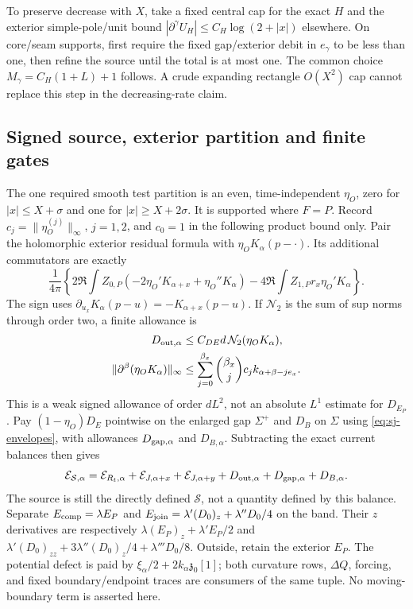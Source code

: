 To preserve decrease with $X$, take a fixed central cap for the exact
$H$ and the exterior simple-pole/unit bound
$|\partial^\gamma U_H|\le C_H\log(2+|x|)$ elsewhere. On core/seam
supports, first require the fixed gap/exterior debit in $e_\gamma$ to
be less than one, then refine the source until the total is at most one.
The common choice $M_\gamma=C_H(1+L)+1$ follows. A crude expanding
rectangle $O(X^2)$ cap cannot replace this step in the decreasing-rate claim.

\subsection{Signed source, exterior partition and finite gates}
The one required smooth test partition is an even, time-independent
$\eta_O$, zero for $|x|\le X+\sigma$ and one for $|x|\ge X+2\sigma$.
It is supported where $F=P$. Record $c_j=\|\eta_O^{(j)}\|_\infty$,
$j=1,2$, and $c_0=1$ in the following product bound only. Pair the
holomorphic exterior residual formula with $\eta_OK_\alpha(p-\cdot)$.
Its additional commutators are exactly
\begin{equation}
 \frac1{4\pi}\left\{2\Re\int Z_{0,P}
           (-2\eta_O'K_{\alpha+x}+\eta_O''K_\alpha)
       -4\Re\int Z_{1,P}r_x\eta_O'K_\alpha\right\}.
 \label{eq:sj-partition}
\end{equation}
The sign uses $\partial_{u_x}K_\alpha(p-u)=-K_{\alpha+x}(p-u)$.
If $\mathcal N_2$ is the sum of sup norms through order two, a finite
allowance is
\begin{align}
 D_{{\rm out},\alpha}&\le C_{DE}d\,\mathcal N_2(\eta_OK_\alpha),\notag\\
 \|\partial^\beta(\eta_OK_\alpha)\|_\infty
 &\le\sum_{j=0}^{\beta_x}\binom{\beta_x}{j}c_j
                                     k_{\alpha+\beta-je_x}.
 \label{eq:sj-exterior-residual}
\end{align}
This is a weak signed allowance of order $dL^2$, not an absolute
$L^1$ estimate for $D_{E_P}$. Pay $(1-\eta_O)D_E$ pointwise on the
enlarged gap $\Sigma^+$ and $D_B$ on $\Sigma$ using
\eqref{eq:sj-envelopes}, with allowances $D_{{\rm gap},\alpha}$ and
$D_{B,\alpha}$. Subtracting the exact current balances then gives
\begin{equation}
 \mathcal E_{\mathcal S,\alpha}
 =\mathcal E_{R_t,\alpha}+\mathcal E_{J,\alpha+x}
   +\mathcal E_{J,\alpha+y}+D_{{\rm out},\alpha}
                         +D_{{\rm gap},\alpha}+D_{B,\alpha}.
 \label{eq:sj-source}
\end{equation}
The source is still the directly defined $\mathcal S$, not a quantity
defined by this balance. Separate $E_{\rm comp}=\lambda E_P$ and
$E_{\rm join}=\lambda'(D_0)_z+\lambda''D_0/4$ on the band. Their
$z$ derivatives are respectively
$\lambda(E_P)_z+\lambda'E_P/2$ and
$\lambda'(D_0)_{zz}+3\lambda''(D_0)_z/4+\lambda'''D_0/8$.
Outside, retain the exterior $E_P$. The potential defect is paid by
$\xi_\alpha/2+2k_\alpha\mathfrak z_0[1]$; both curvature rows,
$\Delta Q$, forcing, and fixed boundary/endpoint traces are consumers
of the same tuple. No moving-boundary term is asserted here.


